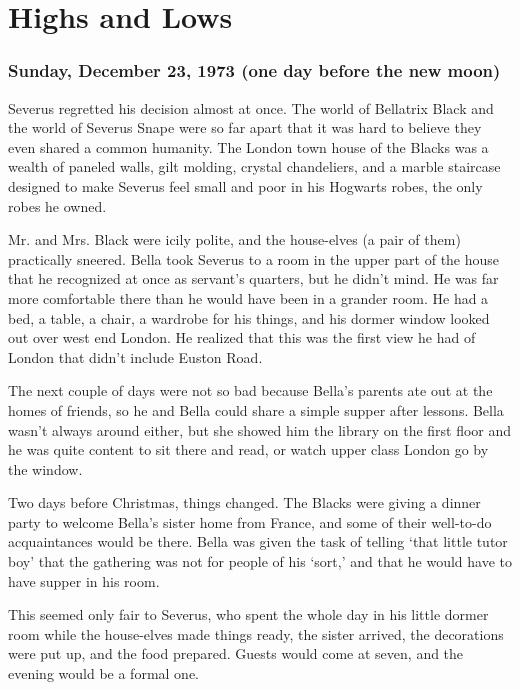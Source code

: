 
\chapter{Highs and Lows}

\subsection{Sunday, December 23, 1973 (one day before the new moon)}

Severus regretted his decision almost at once. The world of Bellatrix Black and the world of Severus Snape were so far apart that it was hard to believe they even shared a common humanity. The London town house of the Blacks was a wealth of paneled walls, gilt molding, crystal chandeliers, and a marble staircase designed to make Severus feel small and poor in his Hogwarts robes, the only robes he owned.

Mr. and Mrs. Black were icily polite, and the house-elves (a pair of them) practically sneered. Bella took Severus to a room in the upper part of the house that he recognized at once as servant's quarters, but he didn't mind. He was far more comfortable there than he would have been in a grander room. He had a bed, a table, a chair, a wardrobe for his things, and his dormer window looked out over west end London. He realized that this was the first view he had of London that didn't include Euston Road.

The next couple of days were not so bad because Bella's parents ate out at the homes of friends, so he and Bella could share a simple supper after lessons. Bella wasn't always around either, but she showed him the library on the first floor and he was quite content to sit there and read, or watch upper class London go by the window.

Two days before Christmas, things changed. The Blacks were giving a dinner party to welcome Bella's sister home from France, and some of their well-to-do acquaintances would be there. Bella was given the task of telling `that little tutor boy' that the gathering was not for people of his `sort,' and that he would have to have supper in his room.

This seemed only fair to Severus, who spent the whole day in his little dormer room while the house-elves made things ready, the sister arrived, the decorations were put up, and the food prepared. Guests would come at seven, and the evening would be a formal one.

